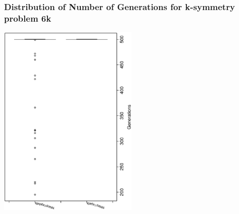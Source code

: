  \begin{frame}
 \frametitle{ Distribution of Number of Generations for k-symmetry problem 6k }
 \begin{center}
\includegraphics[width=0.5\textwidth, angle=-90]
{ExpDboxplottGenerations004.eps}
 \end{center}
 \label{ExpDboxplottGenerations004.eps}  
 \end{frame}

